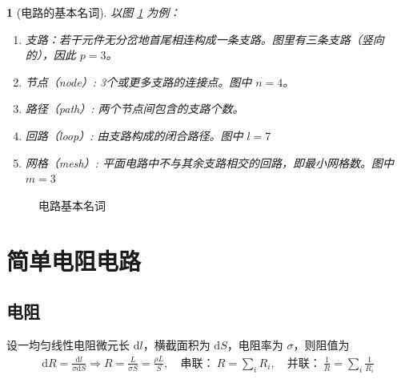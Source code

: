 \documentclass[UTF8]{report}
\theoremstyle{MyLineTheoremStyle} %
\theoremstyle{MyBlockTheoremStyle} %
\theoremstyle{MySubsubsectionStyle} %
\newtheorem{definition}{}
\begin{document}
\begin{center}\noindent\begin{minipage}{0.65\textwidth}
    \begin{definition}[电路的基本名词]
    以图 \ref{电路基本名词} 为例：
    \begin{enumerate}
    \item 支路：若干元件无分岔地首尾相连构成一条支路。图里有三条支路（竖向的），因此 $p = 3$。
    \item 节点（node）: 3个或更多支路的连接点。图中 $n = 4$。 
    \item 路径（path）: 两个节点间包含的支路个数。
    \item 回路（loop）: 由支路构成的闭合路径。图中 $l = 7$
    \item 网格（mesh）: 平面电路中不与其余支路相交的回路，即最小网格数。图中 $m = 3$
    \end{enumerate}
    \end{definition}
\end{minipage}\hfill\begin{minipage}{0.35\textwidth}
    \begin{figure}[H]\centering
        
        \caption{电路基本名词}\label{电路基本名词}
    \end{figure}
\end{minipage}\end{center}





\chapter{简单电阻电路}\thispagestyle{fancy}
\section{电阻}
设一均匀线性电阻微元长 $\mathrm{d} l$，横截面积为 $\mathrm{d}S$，电阻率为 $\sigma$，则阻值为
\begin{gather}
    \mathrm{d}R = \frac{\mathrm{d} l}{\sigma\mathrm{d}S} \Longrightarrow R = \frac{L}{\sigma S} = \frac{\rho L}{S},\quad 
\text{串联：}\ R = \sum_{i}R_i,\quad 
\text{并联：}\ \frac{1}{R} = \sum_{i}\frac{1}{R_i} 
\end{gather}
\end{document}
